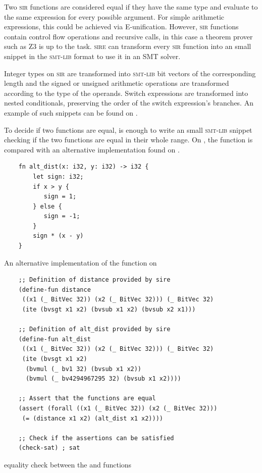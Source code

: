 Two \textsc{sir} functions are considered equal if they have the same type and
evaluate to the same expression for every possible argument. For simple
arithmetic expressions, this could be achieved via E-unification. However,
\textsc{sir} functions contain control flow operations and recursive calls, in
this case a theorem prover such as Z3 is up to the task. \textsc{sire} can
transform every \textsc{sir} function into an small snippet in the
\textsc{smt-lib} format to use it in an SMT solver.

Integer types on \textsc{sir} are transformed into \textsc{smt-lib} bit vectors
of the corresponding length and the signed or unsigned arithmetic operations
are transformed according to the type of the operands. Switch expressions are
transformed into nested conditionals, preserving the order of the switch
expression's branches. An example of such snippets can be found on
. 

To decide if two functions are equal, is enough to write an small
\textsc{smt-lib} snippet checking if the two functions are equal in their whole
range. On , the  function is compared
with an alternative implementation found on . 

\begin{listing}[h]
    \begin{verbatim}
    fn alt_dist(x: i32, y: i32) -> i32 {
        let sign: i32; 
        if x > y {
           sign = 1;
        } else {
           sign = -1;
        }
        sign * (x - y)
    }
    \end{verbatim}
    \caption{An alternative implementation of the  function on }
  \label{lst:alt_distance}
\end{listing}

\begin{listing}[h]
    \begin{verbatim}
    ;; Definition of distance provided by sire
    (define-fun distance 
     ((x1 (_ BitVec 32)) (x2 (_ BitVec 32))) (_ BitVec 32) 
     (ite (bvsgt x1 x2) (bvsub x1 x2) (bvsub x2 x1)))

    ;; Definition of alt_dist provided by sire
    (define-fun alt_dist 
     ((x1 (_ BitVec 32)) (x2 (_ BitVec 32))) (_ BitVec 32) 
     (ite (bvsgt x1 x2) 
      (bvmul (_ bv1 32) (bvsub x1 x2)) 
      (bvmul (_ bv4294967295 32) (bvsub x1 x2))))
    
    ;; Assert that the functions are equal
    (assert (forall ((x1 (_ BitVec 32)) (x2 (_ BitVec 32))) 
     (= (distance x1 x2) (alt_dist x1 x2)))) 

    ;; Check if the assertions can be satisfied
    (check-sat) ; sat
    \end{verbatim}
    \caption{equality check between the  and  functions}
  \label{lst:func_equality}
\end{listing}

